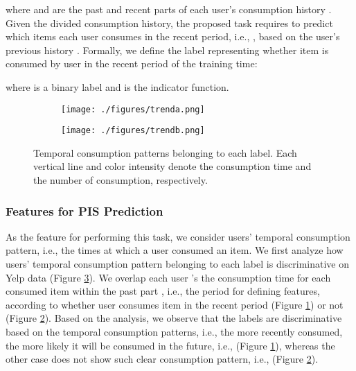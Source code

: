 \documentclass[sigconf]{acmart}
\begin{document}
where  and  are the past and recent parts of each user's consumption history .
Given the divided consumption history, the proposed task requires to predict which items each user  consumes in the recent period, i.e., , based on the user's previous history .
Formally, we define the label representing whether item  is consumed by user  in the recent period of the training time: 

where  is a binary label and  is the indicator function.

\begin{figure}[t]
    \centering
    \begin{subfigure}[b]{0.6\linewidth}
         \centering
         \texttt{[image: ./figures/trenda.png]}
         \caption{}
         \label{fig:pattern1}
     \end{subfigure}
     
     \begin{subfigure}[b]{0.6\linewidth}
         \centering
         \texttt{[image: ./figures/trendb.png]}
         \caption{}
         \label{fig:pattern0}
     \end{subfigure}
     \caption{Temporal consumption patterns belonging to each label. Each vertical line and color intensity denote the consumption time and the number of consumption, respectively.}
     \label{fig:pattern}
\end{figure}

\subsubsection{\textbf{Features for PIS Prediction}}
As the feature for performing this task, we consider users' temporal consumption pattern, i.e., the times at which a user consumed an item.
We first analyze how users' temporal consumption pattern belonging to each label is discriminative on Yelp data (Figure \ref{fig:pattern}). We overlap each user 's the consumption time for each consumed item  within the past part , i.e., the period for defining features, according to whether user  consumes item  in the recent period (Figure \ref{fig:pattern1}) or not (Figure \ref{fig:pattern0}). 
Based on the analysis, we observe that the labels are discriminative based on the temporal consumption patterns, i.e., the more recently consumed, the more likely it will be consumed in the future, i.e.,  (Figure \ref{fig:pattern1}), whereas the other case does not show such clear consumption pattern, i.e.,  (Figure \ref{fig:pattern0}). 
\end{document}
